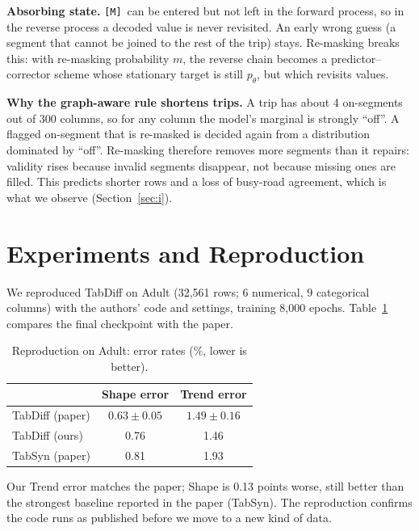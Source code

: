 \documentclass[10pt,twocolumn,a4paper]{article}
\newcommand{\M}{\texttt{[M]}}
\begin{document}
\textbf{Absorbing state.} \M\ can be entered but not left in the forward process, so in the reverse process
a decoded value is never revisited. An early wrong guess (a segment that cannot be joined to the rest of
the trip) stays. Re-masking breaks this: with re-masking probability $m$, the reverse chain becomes a
predictor--corrector scheme whose stationary target is still $p_\theta$, but which revisits values.

\textbf{Why the graph-aware rule shortens trips.} A trip has about 4 on-segments out of 300 columns, so
for any column the model's marginal is strongly ``off''. A flagged on-segment that is re-masked is decided
again from a distribution dominated by ``off''. Re-masking therefore removes more segments than it
repairs: validity rises because invalid segments disappear, not because missing ones are filled. This
predicts shorter rows and a loss of busy-road agreement, which is what we observe (Section~\ref{sec:i}).

\section{Experiments and Reproduction}
\label{sec:f}
We reproduced TabDiff on Adult (32,561 rows; 6 numerical, 9 categorical columns) with the authors' code
and settings, training 8,000 epochs. Table~\ref{tab:repro} compares the final checkpoint with the paper.

\begin{table}[h]
\centering
\caption{Reproduction on Adult: error rates (\%, lower is better).}
\label{tab:repro}
\begin{tabular}{lcc}
\toprule
 & Shape error & Trend error \\
\midrule
TabDiff (paper) & $0.63\pm0.05$ & $1.49\pm0.16$ \\
TabDiff (ours) & 0.76 & 1.46 \\
\midrule
TabSyn (paper) & 0.81 & 1.93 \\
\bottomrule
\end{tabular}
\end{table}

Our Trend error matches the paper; Shape is 0.13 points worse, still better than the strongest baseline
reported in the paper (TabSyn). The reproduction confirms the code runs as published before we move to a
new kind of data.
\end{document}
